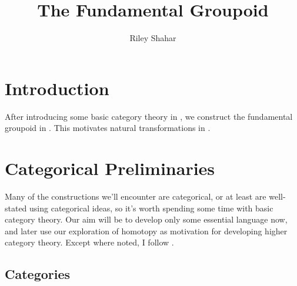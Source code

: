 \documentclass[11 pt]{amsart}
\title{The Fundamental Groupoid}
\author{Riley Shahar}
\theoremstyle{plain}   %
\theoremstyle{definition}
\theoremstyle{remark}
\numberwithin{equation}{section}
\begin{document}
\begin{abstract}
\end{abstract}


\maketitle

\section{Introduction}


After introducing some basic category theory in , we construct
the fundamental groupoid in . This motivates
natural transformations in .

\section{Categorical Preliminaries}\label{categories}

Many of the constructions we'll encounter are categorical, or at least are
well-stated using categorical ideas, so it's worth spending some time with basic
category theory. Our aim will be to develop only some essential language now,
and later use our exploration of homotopy as motivation for developing higher
category theory. Except where noted, I follow \cite[Sections 1.1-1.3]{Riehl}.

\subsection{Categories}
\end{document}
